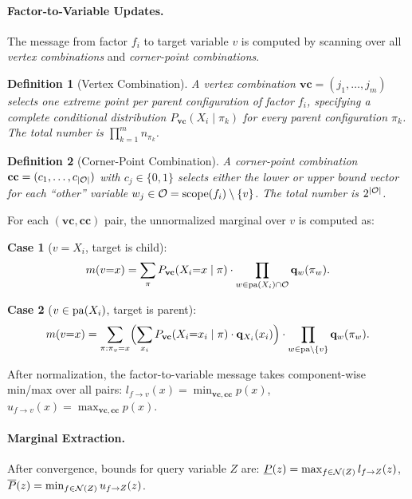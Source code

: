 \documentclass{article}
\newtheorem{definition}{Definition}
\begin{document}
\paragraph{Factor-to-Variable Updates.} The message from factor $f_i$ to target variable $v$ is computed by scanning over all \emph{vertex combinations} and \emph{corner-point combinations}.

\begin{definition}[Vertex Combination]
A vertex combination $\mathbf{vc} = (j_1, \dots, j_m)$ selects one extreme point per parent configuration of factor $f_i$, specifying a complete conditional distribution $P_{\mathbf{vc}}(X_i \mid \pi_k)$ for every parent configuration $\pi_k$. The total number is $\prod_{k=1}^{m} n_{\pi_k}$.
\end{definition}

\begin{definition}[Corner-Point Combination]
A corner-point combination $\mathbf{cc} = (c_1, \dots, c_{|\mathcal{O}|})$ with $c_j \in \{0,1\}$ selects either the lower or upper bound vector for each ``other'' variable $w_j \in \mathcal{O} = \mathrm{scope}(f_i) \setminus \{v\}$. The total number is $2^{|\mathcal{O}|}$.
\end{definition}

For each $(\mathbf{vc}, \mathbf{cc})$ pair, the unnormalized marginal over $v$ is computed as:

\noindent\textbf{Case 1} ($v = X_i$, target is child):
\begin{equation}\label{eq:ibp-case1}
  m(v{=}x) = \sum_{\pi} P_{\mathbf{vc}}(X_i{=}x \mid \pi)
  \cdot \prod_{w \in \mathrm{pa}(X_i) \cap \mathcal{O}} \mathbf{q}_w(\pi_w).
\end{equation}

\noindent\textbf{Case 2} ($v \in \mathrm{pa}(X_i)$, target is parent):
\begin{equation}\label{eq:ibp-case2}
  m(v{=}x) = \sum_{\pi : \pi_v = x}
  \Bigl(\sum_{x_i} P_{\mathbf{vc}}(X_i{=}x_i \mid \pi) \cdot \mathbf{q}_{X_i}(x_i)\Bigr)
  \cdot \prod_{w \in \mathrm{pa} \setminus \{v\}} \mathbf{q}_w(\pi_w).
\end{equation}

After normalization, the factor-to-variable message takes component-wise min/max over all pairs:
$l_{f \to v}(x) = \min_{\mathbf{vc},\mathbf{cc}} p(x)$, \;
$u_{f \to v}(x) = \max_{\mathbf{vc},\mathbf{cc}} p(x)$.

\paragraph{Marginal Extraction.} After convergence, bounds for query variable $Z$ are:
$\underline{P}(z) = \max_{f \in \mathcal{N}(Z)} l_{f \to Z}(z)$, \;
$\overline{P}(z) = \min_{f \in \mathcal{N}(Z)} u_{f \to Z}(z)$.
\end{document}
